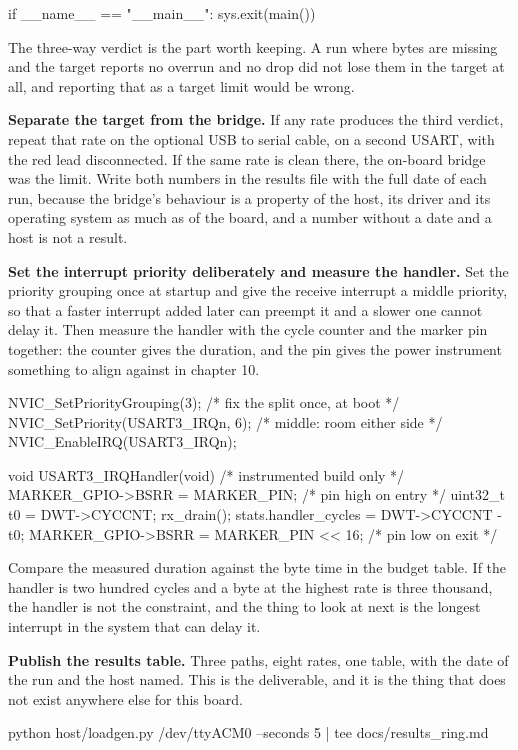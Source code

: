 \begin{steps}
\begin{pycode}
if __name__ == "__main__":
    sys.exit(main())
\end{pycode}
The three-way verdict is the part worth keeping. A run where bytes are missing
and the target reports no overrun and no drop did not lose them in the target at
all, and reporting that as a target limit would be wrong.

\item \textbf{Separate the target from the bridge.} If any rate produces the
third verdict, repeat that rate on the optional USB to serial cable, on a second
USART, with the red lead disconnected. If the same rate is clean there, the
on-board bridge was the limit. Write both numbers in the results file with the
full date of each run, because the bridge's behaviour is a property of the host,
its driver and its operating system as much as of the board, and a number
without a date and a host is not a result.

\item \textbf{Set the interrupt priority deliberately and measure the
handler.} Set the priority grouping once at startup and give the receive
interrupt a middle priority, so that a faster interrupt added later can preempt
it and a slower one cannot delay it. Then measure the handler with the cycle
counter and the marker pin together: the counter gives the duration, and the pin
gives the power instrument something to align against in chapter 10.
\begin{ccode}
NVIC_SetPriorityGrouping(3);                 /* fix the split once, at boot */
NVIC_SetPriority(USART3_IRQn, 6);            /* middle: room either side    */
NVIC_EnableIRQ(USART3_IRQn);

void USART3_IRQHandler(void)                 /* instrumented build only     */
{
    MARKER_GPIO->BSRR = MARKER_PIN;          /* pin high on entry           */
    uint32_t t0 = DWT->CYCCNT;
    rx_drain();
    stats.handler_cycles = DWT->CYCCNT - t0;
    MARKER_GPIO->BSRR = MARKER_PIN << 16;    /* pin low on exit             */
}
\end{ccode}
Compare the measured duration against the byte time in the budget table. If the
handler is two hundred cycles and a byte at the highest rate is three thousand,
the handler is not the constraint, and the thing to look at next is the longest
interrupt in the system that can delay it.

\item \textbf{Publish the results table.} Three paths, eight rates, one table,
with the date of the run and the host named. This is the deliverable, and it is
the thing that does not exist anywhere else for this board.
\begin{shellcode}
python host/loadgen.py /dev/ttyACM0 --seconds 5 | tee docs/results_ring.md
\end{shellcode}
\end{steps}

